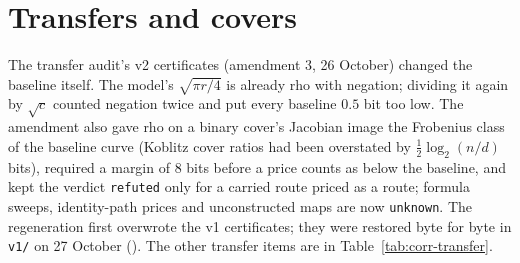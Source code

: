 \section{Transfers and covers}\label{sec:corr-transfer}

The transfer audit's v2 certificates (amendment 3, 26 October) changed the
baseline itself. The model's $\sqrt{\pi r/4}$ is already rho with negation;
dividing it again by $\sqrt c$ counted negation twice and put every baseline
$0.5$ bit too low. The amendment also gave rho on a binary cover's Jacobian
image the Frobenius class of the baseline curve (Koblitz cover ratios had
been overstated by $\tfrac12\log_2(n/d)$ bits), required a margin of 8 bits
before a price counts as below the baseline, and kept the verdict
\texttt{refuted} only for a carried route priced as a route; formula sweeps,
identity-path prices and unconstructed maps are now \texttt{unknown}. The
regeneration first overwrote the v1 certificates; they were restored byte for
byte in \texttt{v1/} on 27 October
(). The other transfer
items are in Table~\ref{tab:corr-transfer}.

